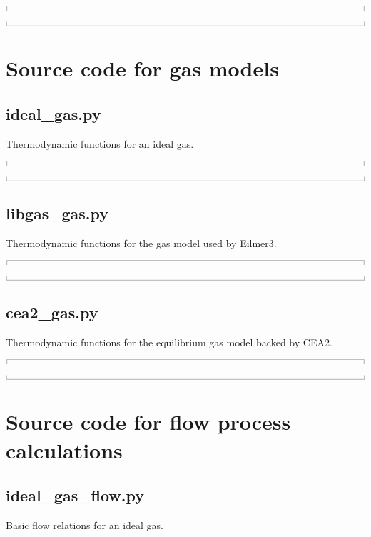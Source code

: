 \documentclass[10pt,a4paper]{article}
\newcommand{\topbar}{\ensuremath{
    \rule{0.1mm}{2.0mm} \rule[2.0mm]{159.5mm}{0.1mm} \rule{0.1mm}{2.0mm}
}}
\newcommand{\bottombar}{\ensuremath{
    \rule{0.1mm}{2.0mm} \rule{159.5mm}{0.1mm} \rule{0.1mm}{2.0mm}
}}
\begin{document}
\medskip
\noindent\topbar

\bottombar


\newpage




\newpage
\appendix
\section{Source code for gas models}
%
\subsection{ideal\_gas.py}
\label{ideal-gas-py}
%
Thermodynamic functions for an ideal gas.

\noindent\topbar

\bottombar

\newpage
\subsection{libgas\_gas.py}
\label{libgas-gas-py}
%
Thermodynamic functions for the gas model used by Eilmer3.

\noindent\topbar

\bottombar

\newpage
\subsection{cea2\_gas.py}
\label{cea2-gas-py}
%
Thermodynamic functions for the equilibrium gas model backed by CEA2.

\noindent\topbar

\bottombar

\newpage
\section{Source code for flow process calculations}
%
\subsection{ideal\_gas\_flow.py}
\label{ideal-gas-flow-py}
%
Basic flow relations for an ideal gas.
\end{document}
